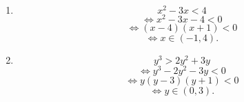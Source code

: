 \begin{enumerate}
\item
\[
x^2 - 3x <4
\]
\[
\iff x^2 - 3x -4 < 0
\]
\[
\iff (x-4)(x+1) < 0
\]
\[
\iff x \in (-1,4).
\]
\item
\[
y^3 > 2y^2 + 3y
\]
\[
\iff y^3 -2y^2 -3y < 0
\]
\[
\iff y(y-3)(y+1) < 0
\]
\[
\iff y \in (0,3).
\]
\end{enumerate}